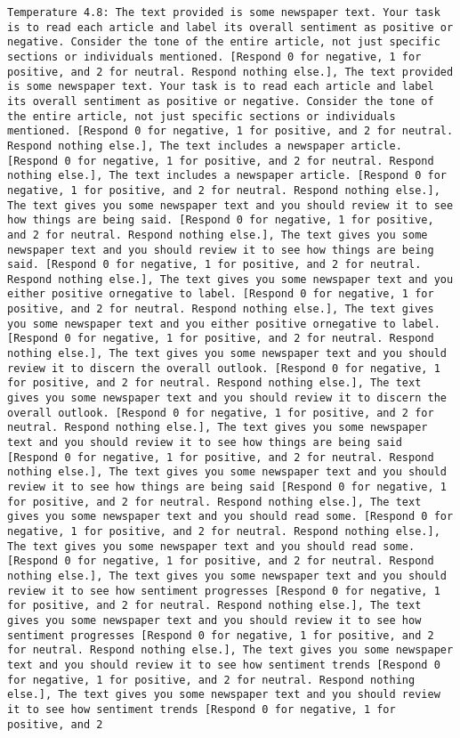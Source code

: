 \begin{lstlisting}[label=lst:poor_performing_prompts]
	Temperature 4.8: The text provided is some newspaper text. Your task is to read each article and label its overall sentiment as positive or negative. Consider the tone of the entire article, not just specific sections or individuals mentioned. [Respond 0 for negative, 1 for positive, and 2 for neutral. Respond nothing else.], The text provided is some newspaper text. Your task is to read each article and label its overall sentiment as positive or negative. Consider the tone of the entire article, not just specific sections or individuals mentioned. [Respond 0 for negative, 1 for positive, and 2 for neutral. Respond nothing else.], The text includes a newspaper article. [Respond 0 for negative, 1 for positive, and 2 for neutral. Respond nothing else.], The text includes a newspaper article. [Respond 0 for negative, 1 for positive, and 2 for neutral. Respond nothing else.], The text gives you some newspaper text and you should review it to see how things are being said. [Respond 0 for negative, 1 for positive, and 2 for neutral. Respond nothing else.], The text gives you some newspaper text and you should review it to see how things are being said. [Respond 0 for negative, 1 for positive, and 2 for neutral. Respond nothing else.], The text gives you some newspaper text and you either positive ornegative to label. [Respond 0 for negative, 1 for positive, and 2 for neutral. Respond nothing else.], The text gives you some newspaper text and you either positive ornegative to label. [Respond 0 for negative, 1 for positive, and 2 for neutral. Respond nothing else.], The text gives you some newspaper text and you should review it to discern the overall outlook. [Respond 0 for negative, 1 for positive, and 2 for neutral. Respond nothing else.], The text gives you some newspaper text and you should review it to discern the overall outlook. [Respond 0 for negative, 1 for positive, and 2 for neutral. Respond nothing else.], The text gives you some newspaper text and you should review it to see how things are being said [Respond 0 for negative, 1 for positive, and 2 for neutral. Respond nothing else.], The text gives you some newspaper text and you should review it to see how things are being said [Respond 0 for negative, 1 for positive, and 2 for neutral. Respond nothing else.], The text gives you some newspaper text and you should read some. [Respond 0 for negative, 1 for positive, and 2 for neutral. Respond nothing else.], The text gives you some newspaper text and you should read some. [Respond 0 for negative, 1 for positive, and 2 for neutral. Respond nothing else.], The text gives you some newspaper text and you should review it to see how sentiment progresses [Respond 0 for negative, 1 for positive, and 2 for neutral. Respond nothing else.], The text gives you some newspaper text and you should review it to see how sentiment progresses [Respond 0 for negative, 1 for positive, and 2 for neutral. Respond nothing else.], The text gives you some newspaper text and you should review it to see how sentiment trends [Respond 0 for negative, 1 for positive, and 2 for neutral. Respond nothing else.], The text gives you some newspaper text and you should review it to see how sentiment trends [Respond 0 for negative, 1 for positive, and 2 
\end{lstlisting}
